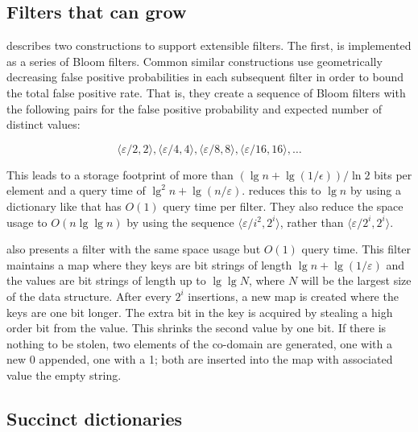 \documentclass[manuscript,screen,review]{acmart}
\begin{document}
\subsection{Filters that can grow}

\cite{psw} describes two constructions to support extensible filters.
The first, is implemented as a series of Bloom filters.
Common similar constructions use geometrically decreasing false positive probabilities in each subsequent filter in order to bound the total false positive rate.
That is, they create a sequence of Bloom filters with the following pairs for the false positive probability and expected number of distinct values:

\[
\langle \varepsilon / 2, 2 \rangle,
 \langle \varepsilon / 4, 4 \rangle,
 \langle \varepsilon / 8, 8 \rangle,
 \langle \varepsilon / 16, 16 \rangle,
 \ldots
\]

This leads to a storage footprint of more than $(\lg n + \lg (1/\epsilon)) / \ln 2$ bits per element and a query time of $\lg^2 n + \lg (n/\varepsilon)$.
\cite{psw} reduces this to $\lg n$ by using a dictionary like \cite{succinct} that has $O(1)$ query time per filter.
They also reduce the space usage to $O(n \lg \lg n)$ by using the sequence $\langle \varepsilon / i^2,  2^i \rangle$, rather than  $\langle \varepsilon / 2^i,  2^i \rangle$.

\cite{psw} also presents a filter with the same space usage but $O(1)$ query time.
This filter maintains a map where they keys are bit strings of length $\lg n + \lg (1/\varepsilon)$ and the values are bit strings of length up to $\lg \lg N$, where $N$ will be the largest size of the data structure.
After every $2^i$ insertions, a new map is created where the keys are one bit longer.
The extra bit in the key is acquired by stealing a high order bit from the value.
This shrinks the second value by one bit.
If there is nothing to be stolen, two elements of the co-domain are generated, one with a new 0 appended, one with a 1; both are inserted into the map with associated value the empty string.

\subsection{Succinct dictionaries}
\end{document}
